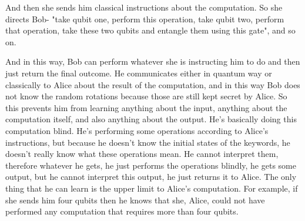 And then she sends him classical instructions about the computation. So she directs Bob- "take qubit one, perform this operation, take qubit two, perform that operation, take these two qubits and entangle them using this gate", and so on.

And in this way, Bob can perform whatever she is instructing him to do and then just return the final outcome. He communicates either in quantum way or classically to Alice about the result of the computation, and in this way Bob does not know the random rotations because those are still kept secret by Alice. So this prevents him from learning anything about the input, anything about the computation itself, and also anything about the output. He's basically doing this computation blind. He's performing some operations according to Alice's instructions, but because he doesn't know the initial states of the keywords, he doesn't really know what these operations mean. He cannot interpret them, therefore whatever he gets, he just performs the operations blindly, he gets some output, but he cannot interpret this output, he just returns it to Alice. The only thing that he can learn is the upper limit to Alice's computation. For example, if she sends him four qubits then he knows that she, Alice, could not have performed any computation that requires more than four qubits.



\newpage
\begin{exercises}



\end{exercises}

